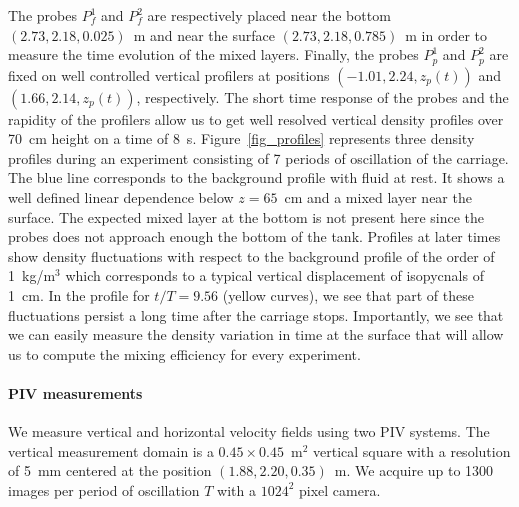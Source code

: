 \noindent The probes $P_f^1$ and $P_f^2$ are respectively placed near the bottom
$(2.73, 2.18, 0.025)$~m and near the surface $(2.73, 2.18, 0.785)$~m in order
to measure the time evolution of the mixed layers.
%
\noindent Finally, the probes $P_p^1$ and $P_p^2$ are fixed on well controlled
vertical profilers at positions $(-1.01, 2.24, z_p(t))$ and
$(1.66, 2.14, z_p(t))$, respectively. The short time response of the probes and
the rapidity of the profilers allow us to get well resolved vertical density
profiles over 70~cm height on a time of $8$~s. Figure~\ref{fig_profiles}
represents three density profiles during an experiment consisting of 7 periods
of oscillation of the carriage. The blue line corresponds to the background
profile with fluid at rest. It shows a well defined linear dependence below  $z=65$~cm
and a mixed layer near the surface. The expected mixed layer at the bottom is not present here since the probes does not approach enough the bottom of the
tank.
%
Profiles at later times show density fluctuations with respect to the
background profile of the order of 1~kg/m$^3$ which corresponds to a
typical vertical displacement of isopycnals of 1~cm. In the profile
for $t/T = 9.56$ (yellow curves), we see that part of these fluctuations persist a long
time after the carriage stops. Importantly, we see that we can easily measure
the density variation in time at the surface that will allow us to compute
the mixing efficiency for every experiment.


\paragraph{PIV measurements}
 We measure vertical and horizontal velocity fields using two PIV
systems. The vertical measurement domain is a $0.45 \times 0.45$~m$^2$ vertical
square with a resolution of 5~mm centered at the position
$(1.88, 2.20, 0.35)$~m. We acquire up to 1300 images per period of oscillation
$T$ with a $1024^2$ pixel camera.

